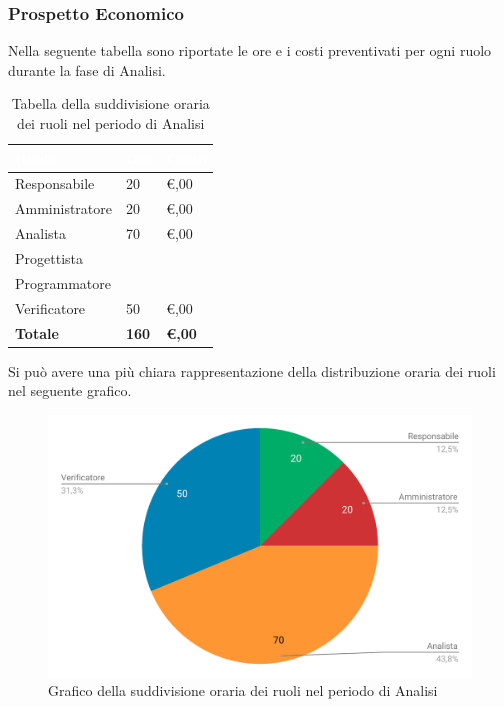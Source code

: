 \subsubsection{Prospetto Economico}
Nella seguente tabella sono riportate le ore e i costi preventivati per ogni ruolo durante la fase di Analisi.


\begin{table}[H]	
	\begin{center}
	    \begin{tabular}{C{4cm}C{1cm}C{3,5cm}}
			\textcolor{white}{\textbf{Ruolo}} & \textcolor{white}{\textbf{Ore}} & \textcolor{white}{\textbf{Costo}}
			\\ \hline
			Responsabile & 20 & \euro {},00 \\
			Amministratore & 20 & \euro {},00 \\
			Analista & 70 & \euro {},00 \\
			Progettista &  & \\
			Programmatore &  & \\
			Verificatore & 50 & \euro {},00 \\
			\textbf{Totale} & \textbf{160} & \textbf{\euro {},00} \\
		\end{tabular}
	    \caption{Tabella della suddivisione oraria dei ruoli nel periodo di Analisi} \label{tab:tabellaRuoliAnalisi} 
	\end{center}
\end{table}


Si può avere una più chiara rappresentazione della distribuzione oraria dei ruoli nel seguente grafico.

\begin{figure}[H]
	\includegraphics[width=1\linewidth]{Preventivo/grafici/AN2.pdf}
	\caption{Grafico della suddivisione oraria dei ruoli nel periodo di Analisi}
\end{figure}

